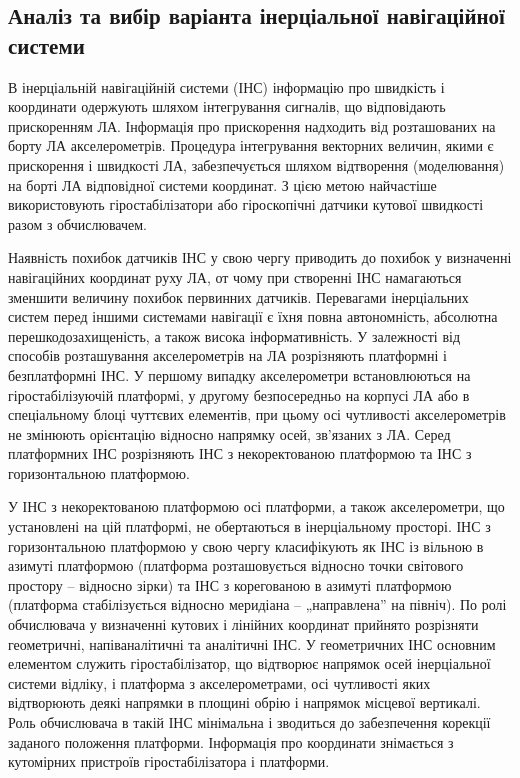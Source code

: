  
\subsection{Аналіз та вибір варіанта інерціальної навігаційної системи}

В інерціальній  навігаційній системи (ІНС)  інформацію про швидкість і 
координати одержують шляхом інтегрування сигналів, що відповідають прискоренням 
ЛА. Інформація про прискорення надходить від розташованих на борту ЛА 
акселерометрів. Процедура інтегрування векторних величин, якими є прискорення і 
швидкості ЛА, забезпечується шляхом відтворення (моделювання) на борті ЛА відповідної 
системи координат. З цією метою найчастіше використовують гіростабілізатори 
або гіроскопічні датчики кутової швидкості разом з обчислювачем. 

Наявність похибок датчиків ІНС у свою чергу приводить до похибок 
у визначенні навігаційних координат руху ЛА, от чому при створенні 
ІНС намагаються зменшити величину похибок первинних датчиків.
Перевагами інерціальних систем перед іншими системами навігації є їхня 
повна автономність, абсолютна перешкодозахищеність, а також висока інформативність.
У залежності від способів розташування акселерометрів на ЛА розрізняють платформні 
і безплатформні ІНС. У першому випадку акселерометри встановлюються на 
гіростабілізуючій платформі, у другому безпосередньо на корпусі ЛА або в 
спеціальному блоці чуттєвих елементів, при цьому осі чутливості акселерометрів 
не змінюють орієнтацію відносно напрямку осей, зв'язаних з ЛА.
Серед платформних ІНС розрізняють ІНС з некоректованою платформою та 
ІНС з горизонтальною платформою. 

У ІНС з некоректованою платформою осі платформи, а також акселерометри, що установлені на 
цій платформі, не обертаються в інерціальному просторі. 
ІНС з горизонтальною платформою у свою чергу класифікують як ІНС із вільною в 
азимуті платформою (платформа розташовується відносно точки світового простору – відносно зірки) 
та ІНС з корегованою в азимуті платформою (платформа стабілізується відносно меридіана – „направлена” на північ).
По ролі обчислювача у визначенні кутових і лінійних координат прийнято 
розрізняти геометричні, напіваналітичні та аналітичні ІНС. У геометричних ІНС 
основним елементом служить гіростабілізатор, що відтворює напрямок осей інерціальної 
системи відліку, і платформа з акселерометрами, осі чутливості яких відтворюють деякі 
напрямки в площині обрію і напрямок місцевої вертикалі. Роль обчислювача в такій ІНС 
мінімальна і зводиться до забезпечення корекції заданого положення платформи. Інформація 
про координати знімається з кутомірних пристроїв гіростабілізатора і платформи.

